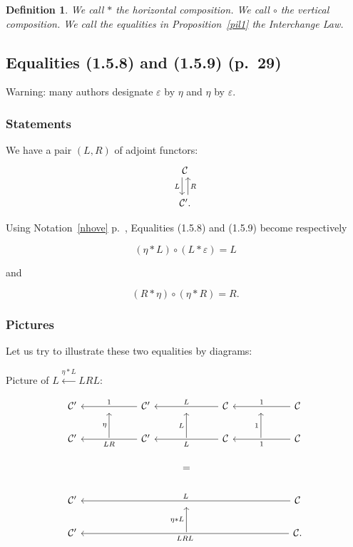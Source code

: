 \documentclass[12pt]{article}%
\newtheorem{df}[thm]{Definition}%
\theoremstyle{remark}
\theoremstyle{definition}
\newcommand{\nn}{\noindent}
\newcommand{\C}{\mathcal C}
\newcommand{\ee}{\varepsilon}
\begin{document}
\begin{df}\label{dil1} 
We call $*$ the {\em horizontal composition}.  We call $\circ$ the {\em vertical composition}.  We call the equalities in Proposition~\ref{pil1} the {\em Interchange Law}. 
\end{df}


\subsection{Equalities (1.5.8) and (1.5.9) (p.~29)}

Warning: many authors designate $\varepsilon$ by $\eta$ and $\eta$ by $\varepsilon$. 

\subsubsection{Statements}

We have a pair $(L,R)$ of adjoint functors: 
$$
\begin{tikzcd}
\C\ar[xshift=-.7ex]{d}[swap]{L}\\ 
\C'.\ar[xshift=.7ex]{u}[swap]{R}
\end{tikzcd}
$$

Using Notation~\ref{nhove} p.~\pageref{nhove}, Equalities (1.5.8) and (1.5.9) become respectively 

\begin{equation}\label{158}
(\eta*L)\circ(L*\ee)=L
\end{equation}

\nn and 

\begin{equation}\label{159}
(R*\eta)\circ(\eta*R)=R.
\end{equation}

\subsubsection{Pictures}

Let us try to illustrate these two equalities by diagrams:

Picture of $L\xleftarrow{\eta*L}LRL$:
 
$$
\begin{tikzcd}
%
\C'&{}&\C'\ar{ll}{}[swap]{1}&{}&\C\ar{ll}{}[swap]{L}&{}&\C\ar{ll}{}[swap]{1}\\ 
%
\C'&\ar{u}{\eta}&\C'\ar{ll}{}{LR}&\ar{u}{L}&\C\ar{ll}{}{L}&\ar{u}{1}&\C\ar{ll}{}{1}\\ 
%
&&&=\\ 
%
\C'&&&{}&&&\C\ar{llllll}[swap]{L}\\
%
\C'&&&\ar{u}{\eta*L}&&&\C\ar{llllll}{LRL}.
%
\end{tikzcd}
$$ 
\end{document}
